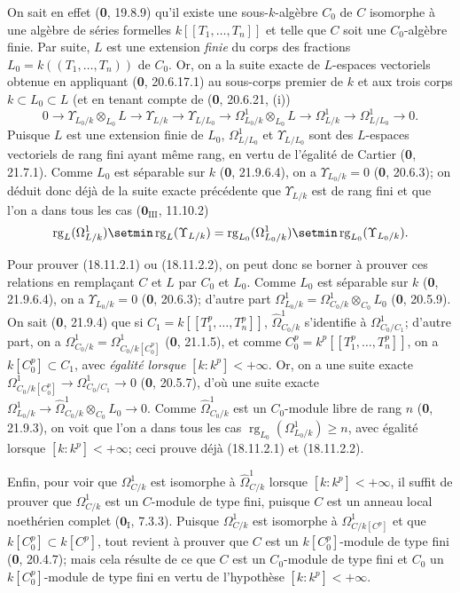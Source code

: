 On sait en effet (\textbf{0}, 19.8.9) qu'il existe une sous-$k$-algèbre $C_0$ de $C$ isomorphe à une algèbre de séries formelles $k[[T_1,\ldots,T_n]]$ et telle que $C$ soit une $C_0$-algèbre finie. Par suite, $L$ est une extension \emph{finie} du corps des fractions $L_0=k((T_1,\ldots,T_n))$ de $C_0$. Or, on a la suite exacte de $L$-espaces vectoriels obtenue en appliquant (\textbf{0}, 20.6.17.1) au sous-corps premier de $k$ et aux trois corps $k\subset L_0\subset L$ (et en tenant compte de (\textbf{0}, 20.6.21, (i))
\[
  0\to\Upsilon_{L_0/k}\otimes_{L_0}L\to\Upsilon_{L/k}\to\Upsilon_{L/L_0}
  \to\Omega^1_{L_0/k}\otimes_{L_0}L\to\Omega^1_{L/k}\to\Omega^1_{L/L_0}\to0.
\]
Puisque $L$ est une extension finie de $L_0$, $\Omega^1_{L/L_0}$ et $\Upsilon_{L/L_0}$ sont des $L$-espaces vectoriels de rang fini ayant même rang, en vertu de l'égalité de Cartier (\textbf{0}, 21.7.1). Comme $L_0$ est séparable sur $k$ (\textbf{0}, 21.9.6.4), on a $\Upsilon_{L_0/k}=0$ (\textbf{0}, 20.6.3); on déduit donc déjà de la suite exacte précédente que $\Upsilon_{L/k}$ est de rang fini et que l'on a dans tous les cas ($\mathbf{0}_{\mathrm{III}}$, 11.10.2)
\[
  \operatorname{rg}_L(\Omega^1_{L/k})\setmin\operatorname{rg}_L(\Upsilon_{L/k})
  =\operatorname{rg}_{L_0}(\Omega^1_{L_0/k})\setmin\operatorname{rg}_{L_0}(\Upsilon_{L_0/k}).
\]

Pour prouver (18.11.2.1) ou (18.11.2.2), on peut donc se borner à prouver ces relations en remplaçant $C$ et $L$ par $C_0$ et $L_0$. Comme $L_0$ est séparable sur $k$ (\textbf{0}, 21.9.6.4), on a $\Upsilon_{L_0/k}=0$ (\textbf{0}, 20.6.3); d'autre part $\Omega^1_{L_0/k}=\Omega^1_{C_0/k}\otimes_{C_0}L_0$ (\textbf{0}, 20.5.9). On sait (\textbf{0}, 21.9.4) que si $C_1=k[[T_1^p,\ldots,T_n^p]]$, $\hat{\Omega}^1_{C_0/k}$ s'identifie à $\Omega^1_{C_0/C_1}$; d'autre part, on a $\Omega^1_{C_0/k}=\Omega^1_{C_0/k[C_0^p]}$ (\textbf{0}, 21.1.5), et comme $C_0^p=k^p[[T_1^p,\ldots,T_n^p]]$, on a $k[C_0^p]\subset C_1$, avec \emph{égalité lorsque} $[k:k^p]<+\infty$. Or, on a une suite exacte $\Omega^1_{C_0/k[C_0^p]}\to\Omega^1_{C_0/C_1}\to0$ (\textbf{0}, 20.5.7), d'où une suite exacte $\Omega^1_{L_0/k}\to\hat{\Omega}^1_{C_0/k}\otimes_{C_0}L_0\to0$. Comme $\hat{\Omega}^1_{C_0/k}$ est un $C_0$-module libre de rang $n$ (\textbf{0}, 21.9.3), on voit que l'on a dans tous les cas $\operatorname{rg}_{L_0}(\Omega^1_{L_0/k})\geq n$, avec égalité lorsque $[k:k^p]<+\infty$; ceci prouve déjà (18.11.2.1) et (18.11.2.2).

Enfin, pour voir que $\Omega^1_{C/k}$ est isomorphe à $\hat{\Omega}^1_{C/k}$ lorsque $[k:k^p]<+\infty$, il suffit de prouver que $\Omega^1_{C/k}$ est un $C$-module de type fini, puisque $C$ est un anneau local noethérien complet ($\mathbf{0}_{\mathrm I}$, 7.3.3). Puisque $\Omega^1_{C/k}$ est isomorphe à $\Omega^1_{C/k[C^p]}$ et que $k[C_0^p]\subset k[C^p]$, tout revient à prouver que $C$ est un $k[C_0^p]$-module de type fini (\textbf{0}, 20.4.7); mais cela résulte de ce que $C$ est un $C_0$-module de type fini et $C_0$ un $k[C_0^p]$-module de type fini en vertu de l'hypothèse $[k:k^p]<+\infty$.

